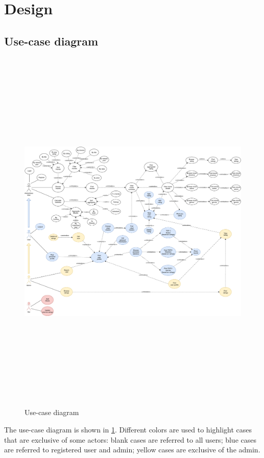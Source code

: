 \documentclass[11pt]{article}
\begin{document}
\section{Design}

\subsection{Use-case diagram}

\begin{figure}
    \centering
    \includegraphics[height=18cm]{figs/use_case.pdf}
    \caption{Use-case diagram}
    \label{fig:usecase}
\end{figure}

The use-case diagram is shown in \cref{fig:usecase}. Different colors are used to highlight cases that are exclusive of some actors: blank cases are referred to all users; blue cases are referred to registered user and admin; yellow cases are exclusive of the admin.
\end{document}

